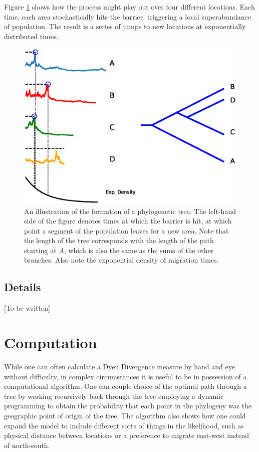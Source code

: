 \documentclass[11pt]{article}
\begin{document}
Figure \ref{evo1} shows how the process might play out over four different locations. Each time, each area stochastically hits the barrier, triggering a local superabundance of population. The result is a series of jumps to new locations at exponentially distributed times.
\begin{figure}[!htbp]
\begin{center}
\includegraphics[width=\textwidth]{AncillaryFiles//figure3.eps}
\caption{An illustration of the formation of a phylogenetic tree. The left-hand side of the figure denotes times at which the barrier is hit, at which point a segment of the population leaves for a new area. Note that the length of the tree corresponds with the length of the path starting at $A$, which is also the same as the sums of the other branches. Also note the exponential density of migration times.} \label{evo1}
\end{center} 
\end{figure}



\subsection{Details}

[To be written]

\section{Computation}

While one can often calculate a Dyen Divergence measure by hand and eye without difficulty, in complex circumstances it is useful to be in possession of a computational algorithm. One can couple choice of the optimal path through a tree by working recursively back through the tree employing a dynamic programming to obtain the probability that each point in the phylogeny was the geographic point of origin of the tree. 
The algorithm also shows how one could expand the model to include different sorts of things in the likelihood, such as physical distance between locations or a preference to migrate east-west instead of north-south. 
\end{document}

